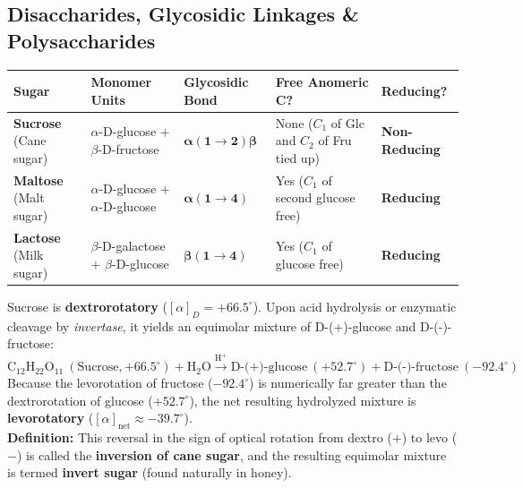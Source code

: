 \documentclass[10pt,a4paper]{article}
\begin{document}
\subsection{Disaccharides, Glycosidic Linkages \& Polysaccharides}

\begin{formulabox}
\begin{tabularx}{\linewidth}{|l|Y|Y|Y|Y|}
\hline
\textbf{Sugar} & \textbf{Monomer Units} & \textbf{Glycosidic Bond} & \textbf{Free Anomeric C?} & \textbf{Reducing?} \\
\hline
\textbf{Sucrose} (Cane sugar) & $\alpha$-D-glucose $+$ $\beta$-D-fructose & $\mathbf{\alpha(1 \to 2)\beta}$ & None ($C_1$ of Glc and $C_2$ of Fru tied up) & \textbf{Non-Reducing} \\
\hline
\textbf{Maltose} (Malt sugar) & $\alpha$-D-glucose $+$ $\alpha$-D-glucose & $\mathbf{\alpha(1 \to 4)}$ & Yes ($C_1$ of second glucose free) & \textbf{Reducing} \\
\hline
\textbf{Lactose} (Milk sugar) & $\beta$-D-galactose $+$ $\beta$-D-glucose & $\mathbf{\beta(1 \to 4)}$ & Yes ($C_1$ of glucose free) & \textbf{Reducing} \\
\hline
\end{tabularx}
\end{formulabox}

\begin{trapbox}
Sucrose is \textbf{dextrorotatory} ($[\alpha]_D = +66.5^\circ$). Upon acid hydrolysis or enzymatic cleavage by \textit{invertase}, it yields an equimolar mixture of D-(+)-glucose and D-(-)-fructose:
\begin{equation}
  \mathrm{C_{12}H_{22}O_{11}} \ (\text{Sucrose}, +66.5^\circ) + \mathrm{H_2O} \xrightarrow{\mathrm{H^+}} \mathrm{D\text{-(+)-glucose}} \ (+52.7^\circ) + \mathrm{D\text{-(-)-fructose}} \ (-92.4^\circ)
\end{equation}
Because the levorotation of fructose ($-92.4^\circ$) is numerically far greater than the dextrorotation of glucose ($+52.7^\circ$), the net resulting hydrolyzed mixture is \textbf{levorotatory} ($[\alpha]_{\text{net}} \approx -39.7^\circ$).\\
\textbf{Definition:} This reversal in the sign of optical rotation from dextro ($+$) to levo ($-$) is called the \textbf{inversion of cane sugar}, and the resulting equimolar mixture is termed \textbf{invert sugar} (found naturally in honey).
\end{trapbox}
\end{document}
